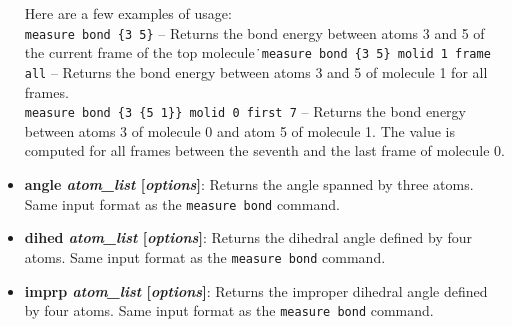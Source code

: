\begin{itemize}
  Here are a few examples of usage:\\
  {\tt measure bond \{3 5\}} -- Returns the bond energy between atoms 3 and 5 of the
  current frame of the top molecule\.\
  {\tt measure bond \{3 5\} molid 1 frame all} -- Returns the bond energy between
  atoms 3 and 5 of molecule 1 for all frames.\\
  {\tt measure bond \{3 \{5 1\}\} molid 0 first 7} -- Returns the bond energy between
  atoms 3 of molecule 0 and atom 5 of molecule 1. The value is computed for all
  frames between the seventh and the last frame of molecule 0.
  
\item {\bf angle {\it atom\_list} [{\it options}]}:
  Returns the angle spanned by three atoms. Same input format as the
  {\tt measure bond} command.

\item {\bf dihed {\it atom\_list} [{\it options}]}:
  Returns the dihedral angle defined by four atoms. Same input format as the
  {\tt measure bond} command.

\item {\bf imprp {\it atom\_list} [{\it options}]}:
  Returns the improper dihedral angle defined by four atoms. Same input format as the
  {\tt measure bond} command.


\end{itemize}
